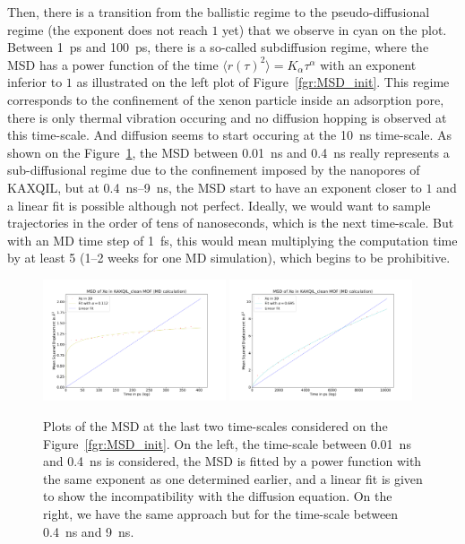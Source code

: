 \documentclass[main]{subfiles}
\begin{document}
Then, there is a transition from the ballistic regime to the pseudo-diffusional regime (the exponent does not reach $1$ yet) that we observe in cyan on the plot. Between \SI{1}{\ps} and \SI{100}{\ps}, there is a so-called subdiffusion regime, where the MSD has a power function of the time $\langle {r(\tau)}^2 \rangle=K_\alpha\tau^\alpha$ with an exponent inferior to $1$ as illustrated on the left plot of Figure~\ref{fgr:MSD_init}. This regime corresponds to the confinement of the xenon particle inside an adsorption pore, there is only thermal vibration occuring and no diffusion hopping is observed at this time-scale. And diffusion seems to start occuring at the \SI{10}{\ns} time-scale. As shown on the Figure~\ref{fgr:MSD_linear_init}, the MSD between \SI{0.01}{\ns} and \SI{0.4}{\ns} really represents a sub-diffusional regime due to the confinement imposed by the nanopores of KAXQIL, but at \SI{0.4}{\ns}--\SI{9}{\ns}, the MSD start to have an exponent closer to $1$ and a linear fit is possible although not perfect. Ideally, we would want to sample trajectories in the order of tens of nanoseconds, which is the next time-scale. But with an MD time step of \SI{1}{\fs}, this would mean multiplying the computation time by at least 5 (1--2 weeks for one MD simulation), which begins to be prohibitive. 

\begin{figure}[ht]
  \centering
\includegraphics[width=0.48\textwidth]{figures/5-diffusion/MSD_Xe_coeff_KAXQIL_clean_1.pdf}
\includegraphics[width=0.48\textwidth]{figures/5-diffusion/MSD_Xe_coeff_KAXQIL_clean_2.pdf}
\caption{ Plots of the MSD at the last two time-scales considered on the Figure~\ref{fgr:MSD_init}. On the left, the time-scale between \SI{0.01}{\ns} and \SI{0.4}{\ns} is considered, the MSD is fitted by a power function with the same exponent as one determined earlier, and a linear fit is given to show the incompatibility with the diffusion equation. On the right, we have the same approach but for the time-scale between \SI{0.4}{\ns} and \SI{9}{\ns}. }\label{fgr:MSD_linear_init}
\end{figure}
\end{document}
